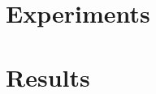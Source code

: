 \documentclass[journal,
transmag,
hidelinks]{IEEEtran}
\newcommand{\0}{\mathbf{0}}
\newcommand{\1}{\mathbf{1}}
\begin{document}
%



\label{sec:Method}



\section{Experiments}
\label{sec:Experiments}


\section{Results}

\end{document}
